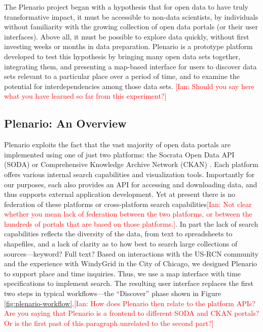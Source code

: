 \documentclass[11pt]{article}
\newcommand{\ian}[1]{\textcolor{Red}{[Ian: #1]}}
\newcommand{\ian}[1]{}
\begin{document}
The Plenario project began with a hypothesis that for open data to have truly transformative impact, it must be accessible to non-data scientists, by individuals without familiarity with the growing collection of open data portals (or their user interfaces). Above all, it must be possible to explore data quickly, without first investing weeks or months in data preparation. Plenario is a prototype platform developed to test this hypothesis by bringing many open data sets together, integrating them, and presenting a map-based interface for users to discover data sets relevant to a particular place over a period of time, and to examine the potential for interdependencies among those data sets.
\ian{Should you say here what you have learned so far from this experiment?}

\subsection{Plenario: An Overview}
Plenario exploits the fact that the vast majority of open data portals are implemented using one of just two platforms: the Socrata Open Data API (SODA) \cite{socrata} or Comprehensive Knowledge Archive Network (CKAN) \cite{ckan}. Each platform offers various internal search capabilities and visualization tools. Importantly for our purposes, each also provides an API for accessing and downloading data, and thus supports external application development. Yet at present there is no federation of these platforms or cross-platform search capabilities\ian{Not clear whether you mean lack of federation between the two platforms, or between the hundreds of portals that are based on those platforms.}. In part the lack of search capabilities reflects the diversity of the data, from text to spreadsheets to shapefiles, and a lack of clarity as to how best to search large collections of sources---keyword? Full text? Based on interactions with the US-RCN community and the experience with WindyGrid in the City of Chicago, we designed Plenario to support place and time inquiries. Thus, we use a map interface with time specifications to implement search. The resulting user interface replaces the first two steps in typical workflows---the ``Discover'' phase shown in Figure \ref{fig:plenario-workflow}.\ian{How does Plenario then relate to the platform APIs? Are you saying that Plenario is a frontend to different SODA and CKAN portals? Or is the first past of this paragraph unrelated to the second part?}
\end{document}
